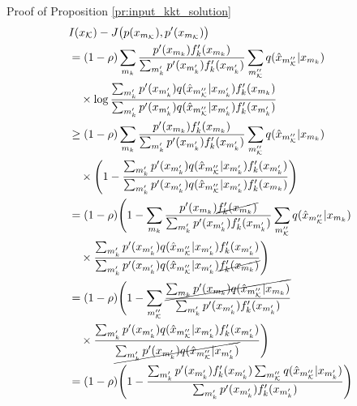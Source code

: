 \documentclass[journal]{IEEEtran}
\begin{document}
\begin{appendix}
\begin{subsection}{Proof of Proposition \ref{pr:input_kkt_solution}}
\begin{subequations}
			\allowdisplaybreaks
			\label{eq:information_difference_upper}
			\begin{align}
				 & I(x_{\mathcal{K}}) - J \bigl( p(x_{m_{\mathcal{K}}}),p'(x_{m_{\mathcal{K}}}) \bigr)                                                                                                                    \nonumber           \\
				 & = (1 - \rho) \sum_{m_k} \frac{p'(x_{m_k}) f_k'(x_{m_k})}{\sum_{m_k'} p'(x_{m_k'}) f_k'(x_{m_k'})} \sum_{m_{\mathcal{K}}''} q(\hat{x}_{m_{\mathcal{K}}''}|x_{m_k})                                      \nonumber           \\
				 & \quad \times \log \frac{\sum_{m_k'} p'(x_{m_k'}) q(\hat{x}_{m_{\mathcal{K}}''}|x_{m_k'}) f_k'(x_{m_k})}{\sum_{m_k'} p'(x_{m_k'}) q(\hat{x}_{m_{\mathcal{K}}''}|x_{m_k'}) f_k'(x_{m_k'})}                                   \\
				 & \ge (1 - \rho) \sum_{m_k} \frac{p'(x_{m_k}) f_k'(x_{m_k})}{\sum_{m_k'} p'(x_{m_k'}) f_k'(x_{m_k'})} \sum_{m_{\mathcal{K}}''} q(\hat{x}_{m_{\mathcal{K}}''}|x_{m_k})                                    \nonumber           \\
				 & \quad \times \Biggl( 1 - \frac{\sum_{m_k'} p'(x_{m_k'}) q(\hat{x}_{m_{\mathcal{K}}''}|x_{m_k'}) f_k'(x_{m_k'})}{\sum_{m_k'} p'(x_{m_k'}) q(\hat{x}_{m_{\mathcal{K}}''}|x_{m_k'}) f_k'(x_{m_k})} \Biggr)                    \\
				 & = (1 - \rho) \Biggl( 1 - \sum_{m_k} \frac{p'(x_{m_k}) \cancel{f_k'(x_{m_k})}}{\sum_{m_k'} p'(x_{m_k'}) f_k'(x_{m_k'})} \sum_{m_{\mathcal{K}}''} q(\hat{x}_{m_{\mathcal{K}}''}|x_{m_k})                 \nonumber           \\
				 & \quad \times \frac{\sum_{m_k'} p'(x_{m_k'}) q(\hat{x}_{m_{\mathcal{K}}''}|x_{m_k'}) f_k'(x_{m_k'})}{\sum_{m_k'} p'(x_{m_k'}) q(\hat{x}_{m_{\mathcal{K}}''}|x_{m_k'}) \cancel{f_k'(x_{m_k})}} \Biggr)                       \\
				 & = (1 - \rho) \Biggl( 1 - \sum_{m_{\mathcal{K}}''} \frac{\cancel{\sum_{m_k} p'(x_{m_k}) q(\hat{x}_{m_{\mathcal{K}}''}|x_{m_k})}}{\sum_{m_k'} p'(x_{m_k'}) f_k'(x_{m_k'})}                                        \nonumber  \\
				 & \quad \times \frac{\sum_{m_k'} p'(x_{m_k'}) q(\hat{x}_{m_{\mathcal{K}}''}|x_{m_k'}) f_k'(x_{m_k'})}{\cancel{\sum_{m_k'} p'(x_{m_k'}) q(\hat{x}_{m_{\mathcal{K}}''}|x_{m_k'})}} \Biggr)                                     \\
				 & = (1 - \rho) \Biggl( 1 - \frac{\sum_{m_k'} p'(x_{m_k'}) f_k'(x_{m_k'}) \sum_{m_{\mathcal{K}}''} q(\hat{x}_{m_{\mathcal{K}}''}|x_{m_k'})}{\sum_{m_k'} p'(x_{m_k'}) f_k'(x_{m_k'})} \Biggr)                        \nonumber \\

\end{align}
\end{subequations}
\end{subsection}
\end{appendix}
\end{document}
